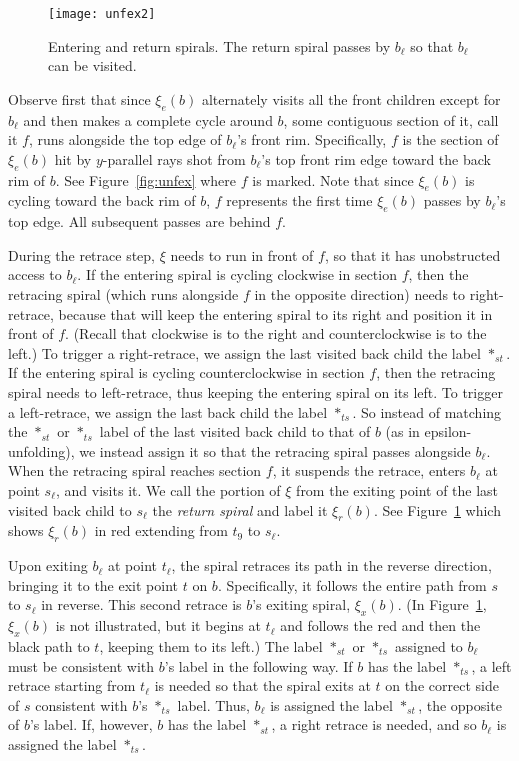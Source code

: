 \documentclass[11pt]{article}
\def\nothing{\ast}
\begin{document}
\begin{figure}[htbp]
\centering
\texttt{[image: unfex2]}
\caption{Entering and return spirals. The return spiral passes by $b_\ell$ so that $b_\ell$
can be visited.}
\label{fig:unfex2}
\end{figure}


Observe first  that since $\xi_e(b)$ alternately visits all the front children
except for $b_\ell$ and then makes a complete cycle
around $b$,
some contiguous section of it, call it $f$, runs
alongside the top edge of $b_\ell$'s front rim.
Specifically, $f$ is the section of $\xi_e(b)$ hit by $y$-parallel rays shot from
$b_\ell$'s top front rim edge toward the back rim of $b$. See Figure~\ref{fig:unfex} where
$f$ is marked. Note that since
$\xi_e(b)$ is cycling toward the back rim of $b$, $f$ represents the first
time $\xi_e(b)$ passes by $b_\ell$'s top edge.
All subsequent passes are behind $f$.

During the retrace step,
 $\xi$ needs to run in front of $f$, so that it has unobstructed
access to $b_\ell$.
If the entering spiral
is cycling clockwise in section $f$, then the retracing spiral (which runs alongside
$f$ in the opposite direction) needs to
right-retrace, because that will keep the entering spiral to its right and
position it in front of $f$.
(Recall that clockwise is to the right and counterclockwise is
to the left.)
To trigger a right-retrace, we assign the last visited back child the label $\nothing_{st}$.
If the entering spiral
is cycling counterclockwise in section $f$, then the retracing spiral needs to
left-retrace, thus keeping the entering spiral on its left.
To trigger a left-retrace, we assign the last back child the label $\nothing_{ts}$.
So instead of matching the $\nothing_{st}$ or $\nothing_{ts}$ label of the last visited back
child to that of $b$ (as in epsilon-unfolding),
we instead assign it so that the retracing spiral passes alongside $b_\ell$.
When the retracing spiral reaches section $f$, it suspends
the retrace, enters $b_\ell$ at point $s_\ell$, and visits it. We call the portion of $\xi$
from the exiting point of the last visited back child to $s_\ell$ the
\emph{return spiral} and label it $\xi_r(b)$. See Figure~\ref{fig:unfex2}
which shows $\xi_r(b)$ in red extending from $t_9$ to $s_\ell$.


Upon exiting $b_\ell$ at point $t_\ell$, the spiral retraces its path
in the reverse direction, bringing it to the exit point $t$ on $b$.
Specifically, it follows the entire path from $s$ to $s_\ell$ in reverse.
This second retrace is $b$'s exiting spiral, $\xi_x(b)$.
(In Figure~\ref{fig:unfex2}, $\xi_x(b)$ is not illustrated, but
it begins at $t_\ell$ and follows the red and then the black path
to $t$, keeping them to its left.)
The label $\nothing_{st}$ or $\nothing_{ts}$ assigned to $b_\ell$ must be consistent
with $b$'s label in the following way. If $b$ has the label $\nothing_{ts}$, a left retrace
starting from $t_\ell$ is needed so that the spiral exits at $t$ on
the correct side of $s$ consistent with $b$'s $\nothing_{ts}$ label. Thus,
$b_\ell$ is assigned the label $\nothing_{st}$, the opposite of $b$'s label. If, however, $b$ has the label $\nothing_{st}$,
a right retrace is needed, and so $b_\ell$ is assigned the label $\nothing_{ts}$.
\end{document}
